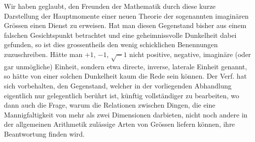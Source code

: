 Wir haben geglaubt, den Freunden der Mathematik durch diese kurze Darstellung der Hauptmomente einer neuen Theorie der sogenannten imaginären Grössen einen Dienst zu erweisen. Hat man diesen Gegenstand bisher aus einem falschen Gesichtspunkt betrachtet und eine geheimnissvolle Dunkelheit dabei 
%
gefunden, so ist dies grossentheils den wenig schicklichen Benennungen zuzuschreiben. Hätte man $+1$, $-1$, $\surd-1$ nicht positive, negative, imaginäre (oder gar unmögliche) Einheit, sondern etwa directe, inverse, laterale Einheit genannt, so hätte von einer solchen Dunkelheit kaum die Rede sein können. Der Verf. hat sich vorbehalten, den Gegenstand, welcher in der vorliegenden Abhandlung eigentlich nur gelegentlich berührt ist, künftig vollständiger zu bearbeiten, wo dann auch die Frage, warum die Relationen zwischen Dingen, die eine Mannigfaltigkeit von mehr als zwei Dimensionen darbieten, nicht noch andere in der allgemeinen Arithmetik zulässige Arten von Grössen liefern können, ihre Beantwortung finden wird.
